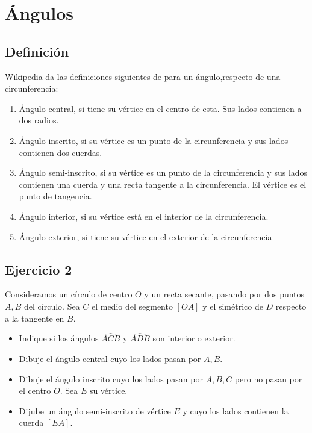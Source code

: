 \section{Ángulos}

\subsection{Definición}

Wikipedia da las definiciones siguientes de
para un ángulo,respecto de una circunferencia:

\begin{enumerate}
\item Ángulo central, si tiene su vértice en el centro de esta. Sus lados
  contienen a dos radios.
\item Ángulo inscrito, si su vértice es un punto de la circunferencia y sus
  lados contienen dos cuerdas.
\item Ángulo semi-inscrito, si su vértice es un punto de la circunferencia y
  sus lados contienen una cuerda y una recta tangente a la circunferencia. El
  vértice es el punto de tangencia.
\item Ángulo interior, si su vértice está en el interior de la circunferencia.
\item Ángulo exterior, si tiene su vértice en el exterior de la circunferencia
\end{enumerate}

\subsection{Ejercicio 2}

Consideramos un círculo de centro $O$
y un recta secante, pasando por dos puntos $A,B$ del
círculo. Sea $C$ el medio del segmento $[OA]$ y el simétrico de $D$
respecto a la tangente en $B$.

\begin{itemize}
\item Indique si los ángulos $\widehat{ACB}$ y $\widehat{ADB}$ son
  interior o exterior.
\item Dibuje el ángulo central cuyo los lados pasan por $A,B$.
\item Dibuje el ángulo inscrito cuyo los lados pasan por $A,B,C$ pero no pasan
  por el centro $O$. Sea $E$ su vértice.
\item Dijube un ángulo semi-inscrito  de vértice $E$ y cuyo los lados
  contienen la cuerda $[EA]$.
\end{itemize}

